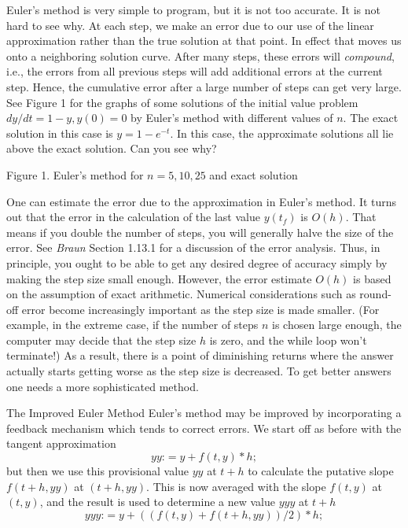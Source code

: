 Euler's method is very simple to program, but it is not too
accurate.  It is not hard to see why.  At each step, we make
an error due to our use of the linear approximation rather
than the true solution at that point.  In effect that moves us
onto a neighboring solution curve.  After many steps, these
errors will {\it compound\/}, i.e., the errors from all previous
 steps will add additional errors at the current step.  Hence,
the cumulative error after a large number of steps can get
very large.   
See Figure 1 for the graphs of some
solutions of the initial value problem  $dy/dt = 1 - y,
y(0) = 0$ by Euler's method with different values of $n$.
The exact solution in this case is $y = 1 - e^{-t}$.
  In this case, the approximate solutions all lie above
 the exact solution.  Can you see why?
\medskip
\centerline{}
\medskip
\centerline{Figure 1.  Euler's method for $n = 5, 10, 25$ and
exact solution}
\bigskip
One can estimate the error due to the approximation in
Euler's method.  It turns out that the error in the
calculation of the last value $y(t_f)$ is $O(h)$.  That means
if you double the number of steps, you will generally halve
the size of the error.  See {\it Braun\/} Section 1.13.1 for
%
a discussion of the error analysis.  Thus, in principle,
you ought to be able to get any desired degree of accuracy
simply by making the step size small enough.  However, the
error estimate $O(h)$ is based on the assumption of exact arithmetic.
Numerical considerations such as round-off error become
increasingly important as the step size is made smaller.
(For example, in the extreme case, if the number of steps
$n$ is chosen large enough, the computer may decide that the
step size $h$ is zero, and the while loop won't terminate!)
 As a result, there is a point of diminishing returns where
the answer actually starts getting worse as the step size
is decreased.   To get better answers one needs a more
sophisticated method.

\subhead The Improved Euler Method \endsubhead
Euler's method may be improved by incorporating a feedback
mechanism which tends to correct errors.  We start off as
%
before with the tangent approximation
$$
yy \text{:}= y + f(t,y)*h;
$$
but then we use this provisional value $yy$ at $t + h$
to calculate the putative slope  $f(t + h, yy)$ at
$(t + h, yy)$.   This is now averaged with the slope
$f(t,y)$ at $(t,y)$, and the result is used to determine
a new value $yyy$ at $t + h$
$$
yyy \text{:}= y + ((f(t,y) + f(t+h,yy))/2)*h;
$$

